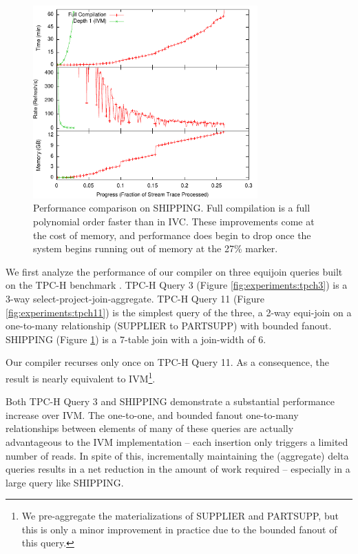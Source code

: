 \begin{figure}
\begin{center}
\includegraphics[width=3.4in]{../graphs/graphs/unified_ssb4.pdf}
\caption{Performance comparison on SHIPPING.  Full compilation is a full polynomial order faster than in IVC.  These improvements come at the cost of memory, and performance does begin to drop once the system begins running out of memory at the 27\% marker.}
\label{fig:experiments:ssb4}
\end{center}
\end{figure}

We first analyze the performance of our compiler on three equijoin queries built on the TPC-H benchmark .  TPC-H Query 3 (Figure \ref{fig:experiments:tpch3}) is a 3-way select-project-join-aggregate.  TPC-H Query 11 (Figure \ref{fig:experiments:tpch11}) is the simplest query of the three, a 2-way equi-join on a one-to-many relationship (SUPPLIER to PARTSUPP) with bounded fanout.  SHIPPING (Figure \ref{fig:experiments:ssb4}) is a 7-table join with a join-width of 6.  

Our compiler recurses only once on TPC-H Query 11.  As a consequence, the result is nearly equivalent to IVM\footnote{We pre-aggregate the materializations of SUPPLIER and PARTSUPP, but this is only a minor improvement in practice due to the bounded fanout of this query.}.  

Both TPC-H Query 3 and SHIPPING demonstrate a substantial performance increase over IVM.  The one-to-one, and bounded fanout one-to-many relationships between elements of many of these queries are actually advantageous to the IVM implementation -- each insertion only triggers a limited number of reads.  In spite of this, incrementally maintaining the (aggregate) delta queries results in a net reduction in the amount of work required -- especially in a large query like SHIPPING.

